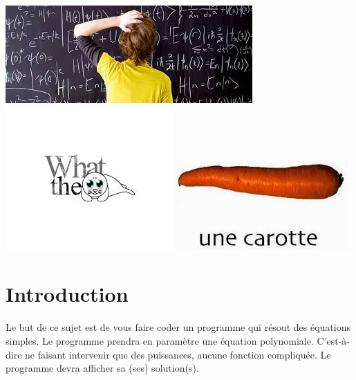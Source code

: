 \documentclass{42}
\begin{document}
\begin{center}
	    \includegraphics[scale=0.35]{what6}
	    \includegraphics[scale=0.35]{what7}
	    \includegraphics[scale=0.35]{what8}
    \end{center}




\chapter{Introduction}

    Le but de ce sujet est de vous faire coder un programme qui résout
    des équations simples. Le programme prendra en paramètre une
    équation polynomiale. C'est-à-dire ne faisant intervenir que des
    puissances, aucune fonction compliquée. Le programme devra
    afficher sa (ses) solution(s).\\
\end{document}
